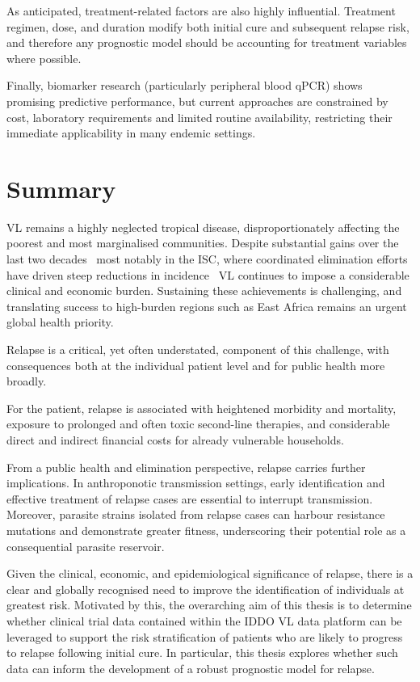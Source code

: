 As anticipated, treatment-related factors are also highly influential. Treatment regimen, dose, and duration modify both initial cure and subsequent relapse risk, and therefore any prognostic model should be accounting for treatment variables where possible.

Finally, biomarker research (particularly peripheral blood qPCR) shows promising predictive performance, but current approaches are constrained by cost, laboratory requirements and limited routine availability, restricting their immediate applicability in many endemic settings.

\section{Summary}

VL remains a highly neglected tropical disease, disproportionately affecting the poorest and most marginalised communities. Despite substantial gains over the last two decades \textemdash\  most notably in the ISC, where coordinated elimination efforts have driven steep reductions in incidence \textemdash\  VL continues to impose a considerable clinical and economic burden. Sustaining these achievements is challenging, and translating success to high-burden regions such as East Africa remains an urgent global health priority\cite{WHO_NTDs_Roadmap_2021_2030}.

Relapse is a critical, yet often understated, component of this challenge, with consequences both at the individual patient level and for public health more broadly.

For the patient, relapse is associated with heightened morbidity and mortality, exposure to prolonged and often toxic second-line therapies, and considerable direct and indirect financial costs for already vulnerable households\cite{sunyoto2019}.

From a public health and elimination perspective, relapse carries further implications. In anthroponotic transmission settings, early identification and effective treatment of relapse cases are essential to interrupt transmission. Moreover, parasite strains isolated from relapse cases can harbour resistance mutations and demonstrate greater fitness, underscoring their potential role as a consequential parasite reservoir.

Given the clinical, economic, and epidemiological significance of relapse, there is a clear and globally recognised need to improve the identification of individuals at greatest risk\cite{WHO2024_Leishmaniasis,WHO_2024_VL_easternAfrica}. Motivated by this, the overarching aim of this thesis is to determine whether clinical trial data contained within the IDDO VL data platform can be leveraged to support the risk stratification of patients who are likely to progress to relapse following initial cure. In particular, this thesis explores whether such data can inform the development of a robust prognostic model for relapse.

